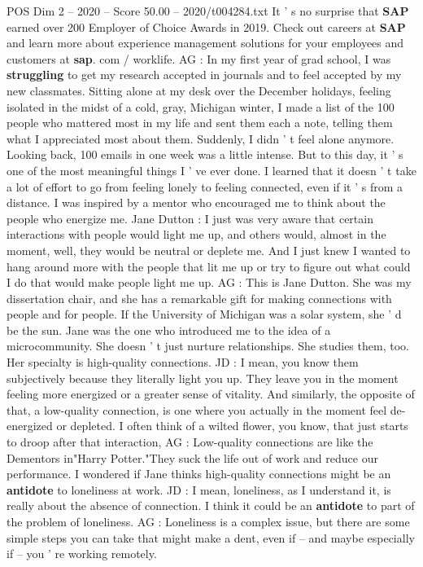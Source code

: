 \begin{textsample}{POS Dim 2 – 2020 – Score 50.00 – 2020/t004284.txt}
It ' s no surprise that \textbf{SAP} earned over 200 Employer of Choice Awards in 2019.
Check out careers at \textbf{SAP} and learn more about experience management solutions for your employees and customers at \textbf{sap}. com / worklife.
AG : In my first year of grad school, I was \textbf{struggling} to get my research accepted in journals and to feel accepted by my new classmates.
Sitting alone at my desk over the December holidays, feeling isolated in the midst of a cold, gray, Michigan winter, I made a list of the 100 people who mattered most in my life and sent them each a note, telling them what I appreciated most about them.
Suddenly, I didn ' t feel alone anymore.
Looking back, 100 emails in one week was a little intense.
But to this day, it ' s one of the most meaningful things I ' ve ever done.
I learned that it doesn ' t take a lot of effort to go from feeling lonely to feeling connected, even if it ' s from a distance.
I was inspired by a mentor who encouraged me to think about the people who energize me.
Jane Dutton : I just was very aware that certain interactions with people would light me up, and others would, almost in the moment, well, they would be neutral or deplete me.
And I just knew I wanted to hang around more with the people that lit me up or try to figure out what could I do that would make people light me up.
AG : This is Jane Dutton.
She was my dissertation chair, and she has a remarkable gift for making connections with people and for people.
If the University of Michigan was a solar system, she ' d be the sun.
Jane was the one who introduced me to the idea of a microcommunity.
She doesn ' t just nurture relationships.
She studies them, too.
Her specialty is high-quality connections.
JD : I mean, you know them subjectively because they literally light you up.
They leave you in the moment feeling more energized or a greater sense of vitality.
And similarly, the opposite of that, a low-quality connection, is one where you actually in the moment feel de-energized or depleted.
I often think of a wilted flower, you know, that just starts to droop after that interaction, AG : Low-quality connections are like the Dementors in"Harry Potter."They suck the life out of work and reduce our performance.
I wondered if Jane thinks high-quality connections might be an \textbf{antidote} to loneliness at work.
JD : I mean, loneliness, as I understand it, is really about the absence of connection.
I think it could be an \textbf{antidote} to part of the problem of loneliness.
AG : Loneliness is a complex issue, but there are some simple steps you can take that might make a dent, even if -- and maybe especially if -- you ' re working remotely.

\end{textsample}
